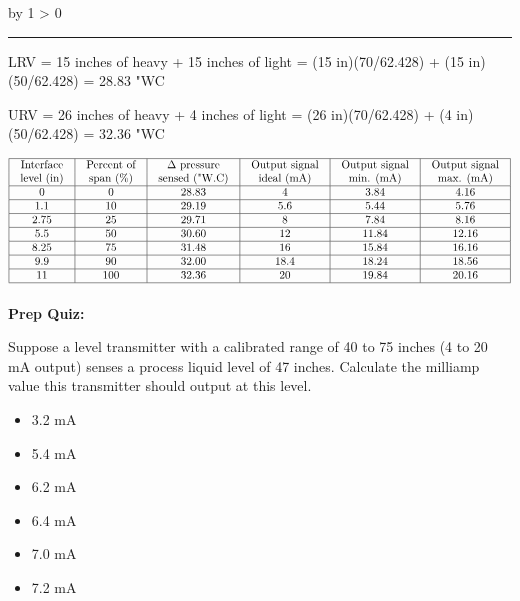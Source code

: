 \documentclass[12pt,a4paper]{article}
\def\notes{
           \advance\explnum by 1
           \ifnum \explnum > 0
                \hrule
                \vskip 3pt
                \leftline{Notes \the\explnum}
                \vskip 3pt \fi}
\begin{document}
\vskip 10pt \filbreak 





\notes{} 

LRV = 15 inches of heavy + 15 inches of light = (15 in)(70/62.428) + (15 in)(50/62.428) = 28.83 "WC

\vskip 10pt

URV = 26 inches of heavy + 4 inches of light = (26 in)(70/62.428) + (4 in)(50/62.428) = 32.36 "WC


$$\vbox{\offinterlineskip
\halign{\strut
\vrule \quad\hfil # \ \hfil & 
\vrule \quad\hfil # \ \hfil & 
\vrule \quad\hfil # \ \hfil & 
\vrule \quad\hfil # \ \hfil & 
\vrule \quad\hfil # \ \hfil & 
\vrule \quad\hfil # \ \hfil \vrule \cr
\noalign{\hrule}
%
Interface & Percent of & $\Delta$ pressure & Output signal & Output signal & Output signal \cr
%
level (in) & span (\%) & sensed ("W.C) & ideal (mA) & min. (mA) & max. (mA) \cr
%
\noalign{\hrule}
%
0 & 0 & 28.83 & 4 & 3.84 & 4.16 \cr
%
\noalign{\hrule}
%
1.1 & 10 & 29.19 & 5.6 & 5.44 & 5.76 \cr
%
\noalign{\hrule}
%
2.75 & 25 & 29.71 & 8 & 7.84 & 8.16 \cr
%
\noalign{\hrule}
%
5.5 & 50 & 30.60 & 12 & 11.84 & 12.16 \cr
%
\noalign{\hrule}
%
8.25 & 75 & 31.48 & 16 & 15.84 & 16.16 \cr
%
\noalign{\hrule}
%
9.9 & 90 & 32.00 & 18.4 & 18.24 & 18.56 \cr
%
\noalign{\hrule}
%
11 & 100 & 32.36 & 20 & 19.84 & 20.16 \cr
%
\noalign{\hrule}
} %
}$$ %












\vfil \eject

\noindent
{\bf Prep Quiz:}

Suppose a level transmitter with a calibrated range of 40 to 75 inches (4 to 20 mA output) senses a process liquid level of 47 inches.  Calculate the milliamp value this transmitter should output at this level.

\begin{itemize}
\item{} 3.2 mA
\vskip 5pt 
\item{} 5.4 mA
\vskip 5pt 
\item{} 6.2 mA
\vskip 5pt 
\item{} 6.4 mA
\vskip 5pt 
\item{} 7.0 mA
\vskip 5pt 
\item{} 7.2 mA
\end{itemize}
\end{document}
